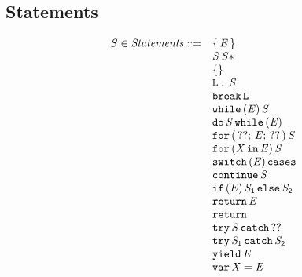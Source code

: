 \documentclass{article}
\begin{document}
\subsection{Statements}
\label{subsec:stmt-syntax}
%
\newcommand{\ExpressionStatement}[1]{\{\, #1\, \}}
\newcommand{\Block}[1]{#1\, \statementmeta*}
\newcommand{\EmptyStatement}{\{\}}
%
%
\newcommand{\LabeledStatement}[2]{#1:\, #2}
\newcommand{\BreakStatement}[1]{\tt{break}\, #1}
\newcommand{\WhileStatement}[2]{\tt{while}\, (#1)\, #2}
\newcommand{\DoStatement}[2]{\tt{do}\, #1\, \tt{while}\, (#2)}
\newcommand{\ForStatement}[4]{\tt{for}\, (\,#1;\, #2;\, #3\,)\, #4}
\newcommand{\ForInStatement}[3]{\tt{for}\,(#1\,\tt{in}\,#2)\,#3}
%
\newcommand{\SwitchStatement}[1]{\tt{switch}\,(#1)\,\tt{cases}}
\newcommand{\ContinueSwitchStatement}[1]{\tt{continue}\,#1}
\newcommand{\IfStatement}[3]{\tt{if}\,(#1)\,#2\,\tt{else}\,#3}
\newcommand{\ReturnStatement}[1]{\tt{return}\,#1}
%
\newcommand{\TryCatch}[2]{\tt{try}\,#1\,\tt{catch}\,#2}
\newcommand{\TryFinally}[2]{\tt{try}\,#1\,\tt{catch}\,#2}
%
\newcommand{\Yield}[1]{\tt{yield}\,#1}
%
\newcommand{\VarDeclaration}[2]{\tt{var}\,#1=#2}
%
%
\[
\begin{array}{rl}

  \statementmeta \in \mathit{Statements} ::=
  & \ExpressionStatement{\expressionmeta} \\
  & \Block{\statementmeta} \\
  & \EmptyStatement \\
  & \LabeledStatement{\labelmeta}{\statementmeta} \\
  & \BreakStatement{\labelmeta} \\
  & \WhileStatement{\expressionmeta}{\statementmeta} \\
  & \DoStatement{\statementmeta}{\expressionmeta} \\
  & \ForStatement{??}{\expressionmeta}{??}{\statementmeta} \\
  & \ForInStatement{\idmeta}{\expressionmeta}{\statementmeta} \\
  & \SwitchStatement{\expressionmeta} \\
  & \ContinueSwitchStatement{\statementmeta} \\
  & \IfStatement{\expressionmeta}{\statementmeta_1}{\statementmeta_2} \\
  & \ReturnStatement{\expressionmeta} \\
  & \ReturnStatement{} \\
  & \TryCatch{\statementmeta}{??} \\
  & \TryFinally{\statementmeta_1}{\statementmeta_2} \\
  & \Yield{\expressionmeta} \\
  & \VarDeclaration{\idmeta}{\expressionmeta} \\

\end{array}
\]
\end{document}
